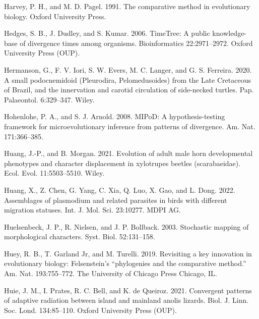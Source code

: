 \documentclass[fleqn,10pt,lineno]{wlpeerj} %
\newlength{\cslhangindent}
\newlength{\cslentryspacingunit} %
\newenvironment{CSLReferences}[2] %
 {%
  \setlength{\parindent}{0pt}
  \ifodd #1
  \let\oldpar\par
  \def\par{\hangindent=\cslhangindent\oldpar}
  \fi
  \setlength{\parskip}{#2\cslentryspacingunit}
 }%
 {}
\begin{document}
\begin{CSLReferences}{1}{0}
\leavevmode{}%
Harvey, P. H., and M. D. Pagel. 1991. The comparative method in evolutionary biology. Oxford University Press.

\leavevmode{}%
Hedges, S. B., J. Dudley, and S. Kumar. 2006. {TimeTree}: A public knowledge-base of divergence times among organisms. Bioinformatics 22:2971--2972. Oxford University Press (OUP).

\leavevmode{}%
Hermanson, G., F. V. Iori, S. W. Evers, M. C. Langer, and G. S. Ferreira. 2020. A small podocnemidoid ({P}leurodira, {P}elomedusoides) from the {L}ate {C}retaceous of {B}razil, and the innervation and carotid circulation of side-necked turtles. Pap. Palaeontol. 6:329--347. Wiley.

\leavevmode{}%
Hohenlohe, P. A., and S. J. Arnold. 2008. {MIPoD}: A hypothesis-testing framework for microevolutionary inference from patterns of divergence. Am. Nat. 171:366--385.

\leavevmode{}%
Huang, J.-P., and B. Morgan. 2021. Evolution of adult male horn developmental phenotypes and character displacement in xylotrupes beetles (scarabaeidae). Ecol. Evol. 11:5503--5510. Wiley.

\leavevmode{}%
Huang, X., Z. Chen, G. Yang, C. Xia, Q. Luo, X. Gao, and L. Dong. 2022. Assemblages of plasmodium and related parasites in birds with different migration statuses. Int. J. Mol. Sci. 23:10277. MDPI AG.

\leavevmode{}%
Huelsenbeck, J. P., R. Nielsen, and J. P. Bollback. 2003. Stochastic mapping of morphological characters. Syst. Biol. 52:131--158.

\leavevmode{}%
Huey, R. B., T. Garland Jr, and M. Turelli. 2019. Revisiting a key innovation in evolutionary biology: Felsenstein's {``phylogenies and the comparative method.''} Am. Nat. 193:755--772. The University of Chicago Press Chicago, IL.

\leavevmode{}%
Huie, J. M., I. Prates, R. C. Bell, and K. de Queiroz. 2021. Convergent patterns of adaptive radiation between island and mainland anolis lizards. Biol. J. Linn. Soc. Lond. 134:85--110. Oxford University Press (OUP).


\end{CSLReferences}
\end{document}
